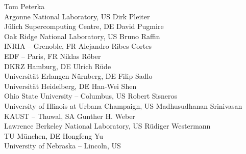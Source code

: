 \documentclass[a4paper,UKenglish]{dagrep}
\begin{document}
\begin{participants}
\participant Tom Peterka \\ Argonne National Laboratory, US
\participant Dirk Pleiter \\ Jülich Supercomputing Centre, DE
\participant David Pugmire \\ Oak Ridge National Laboratory, US
\participant Bruno Raffin \\ INRIA – Grenoble, FR
\participant Alejandro Ribes Cortes \\ EDF – Paris, FR
\participant Niklas Röber \\ DKRZ Hamburg, DE
\participant Ulrich Rüde \\ Universität Erlangen-Nürnberg, DE
\participant Filip Sadlo \\ Universität Heidelberg, DE
\participant Han-Wei Shen \\ Ohio State University – Columbus, US
\participant Robert Sisneros \\ University of Illinois at Urbana Champaign, US
\participant Madhusudhanan Srinivasan \\ KAUST – Thuwal, SA
\participant Gunther H. Weber \\ Lawrence Berkeley National Laboratory, US
\participant Rüdiger Westermann \\ TU München, DE
\participant Hongfeng Yu \\ University of Nebraska – Lincoln, US
\end{participants}
\end{document}
